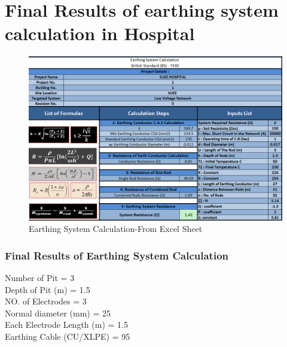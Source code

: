\documentclass[12pt,fleqn]{book} %
\begin{document}
\section{Final Results of earthing system calculation in Hospital }
    \begin{figure}[!h]
    \centering
    \includegraphics[width=1\linewidth]{earth 8.png}
    \caption{Earthing System Calculation-From Excel Sheet}
    \label{fig:earth 8}
\end{figure}
\subsubsection{Final Results of Earthing System Calculation}
Number of Pit = 3
\\ Depth of Pit (m) = 1.5
\\ NO. of Electrodes = 3 
\\ Normal diameter (mm) = 25
\\ Each  Electrode Length (m) = 1.5
\\ Earthing Cable  (CU/XLPE) = 95
\end{document}
